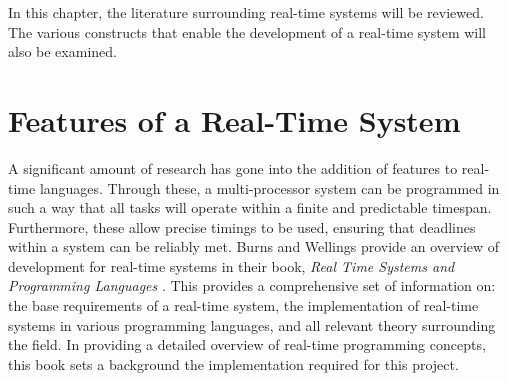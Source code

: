 



In this chapter, the literature surrounding real-time systems will be
reviewed. The various constructs that enable the development of a real-time
system will also be examined.

\section{Features of a Real-Time System}

A significant amount of research has gone into the addition of features to
real-time languages. Through these, a multi-processor system can be
programmed in such a way that all tasks will operate within a finite and 
predictable timespan. Furthermore, these allow precise timings to be
used, ensuring that deadlines within a system can be reliably met.  Burns and
Wellings provide an overview of development for real-time systems in
their book, \emph{Real Time Systems and Programming Languages}
\cite{real-time-systems}.  This provides a comprehensive set of
information on: 
the base requirements of a real-time system, 
the implementation of real-time systems in various programming languages, 
and all relevant theory surrounding the field. 
In providing a detailed overview of real-time programming concepts, 
this book sets a background the implementation required for
this project.

